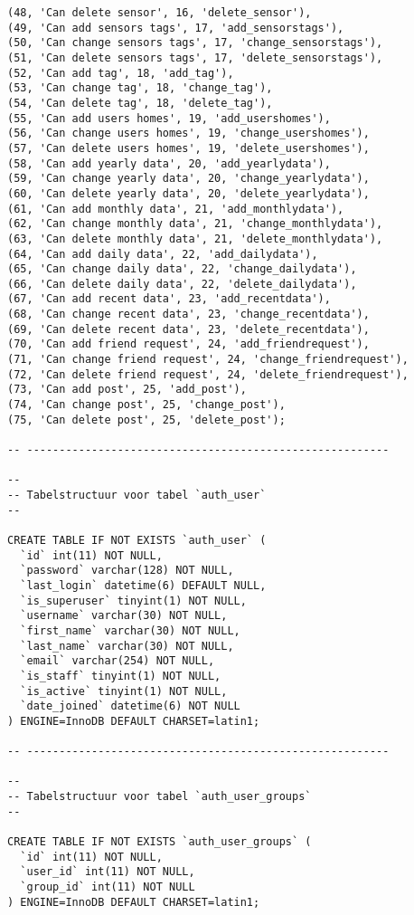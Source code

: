 \documentclass[11pt]{article}
\begin{document}
\begin{lstlisting}[style=SQL]
(48, 'Can delete sensor', 16, 'delete_sensor'),
(49, 'Can add sensors tags', 17, 'add_sensorstags'),
(50, 'Can change sensors tags', 17, 'change_sensorstags'),
(51, 'Can delete sensors tags', 17, 'delete_sensorstags'),
(52, 'Can add tag', 18, 'add_tag'),
(53, 'Can change tag', 18, 'change_tag'),
(54, 'Can delete tag', 18, 'delete_tag'),
(55, 'Can add users homes', 19, 'add_usershomes'),
(56, 'Can change users homes', 19, 'change_usershomes'),
(57, 'Can delete users homes', 19, 'delete_usershomes'),
(58, 'Can add yearly data', 20, 'add_yearlydata'),
(59, 'Can change yearly data', 20, 'change_yearlydata'),
(60, 'Can delete yearly data', 20, 'delete_yearlydata'),
(61, 'Can add monthly data', 21, 'add_monthlydata'),
(62, 'Can change monthly data', 21, 'change_monthlydata'),
(63, 'Can delete monthly data', 21, 'delete_monthlydata'),
(64, 'Can add daily data', 22, 'add_dailydata'),
(65, 'Can change daily data', 22, 'change_dailydata'),
(66, 'Can delete daily data', 22, 'delete_dailydata'),
(67, 'Can add recent data', 23, 'add_recentdata'),
(68, 'Can change recent data', 23, 'change_recentdata'),
(69, 'Can delete recent data', 23, 'delete_recentdata'),
(70, 'Can add friend request', 24, 'add_friendrequest'),
(71, 'Can change friend request', 24, 'change_friendrequest'),
(72, 'Can delete friend request', 24, 'delete_friendrequest'),
(73, 'Can add post', 25, 'add_post'),
(74, 'Can change post', 25, 'change_post'),
(75, 'Can delete post', 25, 'delete_post');

-- --------------------------------------------------------

--
-- Tabelstructuur voor tabel `auth_user`
--

CREATE TABLE IF NOT EXISTS `auth_user` (
  `id` int(11) NOT NULL,
  `password` varchar(128) NOT NULL,
  `last_login` datetime(6) DEFAULT NULL,
  `is_superuser` tinyint(1) NOT NULL,
  `username` varchar(30) NOT NULL,
  `first_name` varchar(30) NOT NULL,
  `last_name` varchar(30) NOT NULL,
  `email` varchar(254) NOT NULL,
  `is_staff` tinyint(1) NOT NULL,
  `is_active` tinyint(1) NOT NULL,
  `date_joined` datetime(6) NOT NULL
) ENGINE=InnoDB DEFAULT CHARSET=latin1;

-- --------------------------------------------------------

--
-- Tabelstructuur voor tabel `auth_user_groups`
--

CREATE TABLE IF NOT EXISTS `auth_user_groups` (
  `id` int(11) NOT NULL,
  `user_id` int(11) NOT NULL,
  `group_id` int(11) NOT NULL
) ENGINE=InnoDB DEFAULT CHARSET=latin1;


\end{lstlisting}
\end{document}

